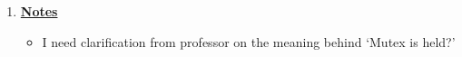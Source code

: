 \documentclass[12pt]{article}
\begin{document}
\begin{enumerate}[1.]
\begin{enumerate}[a)]
\begin{itemize}


        \end{itemize}


    \end{enumerate}

    \bigskip

    \item

    \bigskip

    \underline{\textbf{Notes}}

    \begin{itemize}
        \item I need clarification from professor on the meaning behind `Mutex is held?'
    \end{itemize}
\end{enumerate}
\end{document}

